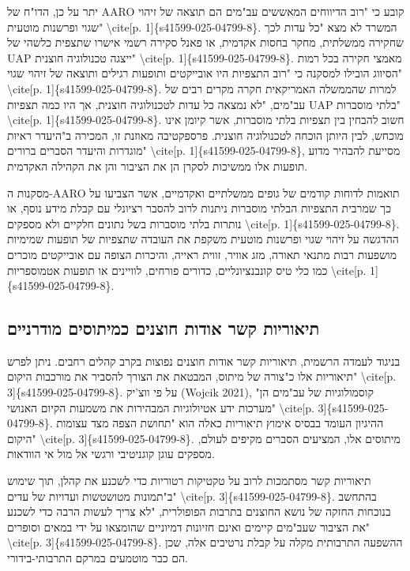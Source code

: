 \documentclass[12pt,a4paper]{article}
\begin{document}
יתר על כן, הדו"ח של AARO קובע כי "רוב הדיווחים המאששים עב"מים הם תוצאה של זיהוי שגוי ופרשנות מוטעית" \textbackslash{}cite[p. 1]\{s41599-025-04799-8\}. המשרד לא מצא "כל עדות לכך שחקירה ממשלתית, מחקר בחסות אקדמית, או פאנל סקירה רשמי אישרו שתצפית כלשהי של UAP ייצגה טכנולוגיה חוצנית" \textbackslash{}cite[p. 1]\{s41599-025-04799-8\}. מאמצי חקירה בכל רמות הסיווג הובילו למסקנה כי "רוב התצפיות היו אובייקטים ותופעות רגילים ותוצאה של זיהוי שגוי" \textbackslash{}cite[p. 1]\{s41599-025-04799-8\}. למרות שהממשלה האמריקאית חקרה מקרים רבים של עב"מים, "לא נמצאה כל עדות לטכנולוגיה חוצנית, אך היו כמה תצפיות UAP בלתי מוסברות" \textbackslash{}cite[p. 1]\{s41599-025-04799-8\}. חשוב להבחין בין תצפיות בלתי מוסברות, אשר קיומן אינו מוכחש, לבין היותן הוכחה לטכנולוגיה חוצנית. פרספקטיבה מאוזנת זו, המכירה ב"היעדר ראיות מוגדרות והיעדר הסברים ברורים" \textbackslash{}cite[p. 1]\{s41599-025-04799-8\}, מסייעת להבהיר מדוע תופעות אלו ממשיכות לסקרן הן את הציבור והן את הקהילה האקדמית.

מסקנות ה-AARO תואמות לדוחות קודמים של גופים ממשלתיים ואקדמיים, אשר הצביעו על כך שמרבית התצפיות הבלתי מוסברות ניתנות לרוב להסבר רציונלי עם קבלת מידע נוסף, או נותרות בלתי מוסברות בשל נתונים חלקיים ולא מספקים \textbackslash{}cite[p. 1]\{s41599-025-04799-8\}. ההדגשה על זיהוי שגוי ופרשנות מוטעית משקפת את העובדה שתצפיות של תופעות שמימיות מושפעות רבות מתנאי תאורה, מזג אוויר, זווית ראייה, והיכרות הצופה עם אובייקטים מוכרים כמו כלי טיס קונבנציונליים, כדורים פורחים, לוויינים או תופעות אטמוספריות \textbackslash{}cite[p. 1]\{s41599-025-04799-8\}.

\subsection{תיאוריות קשר אודות חוצנים כמיתוסים מודרניים}
בניגוד לעמדה הרשמית, תיאוריות קשר אודות חוצנים נפוצות בקרב קהלים רחבים. ניתן לפרש תיאוריות אלו כ"צורה של מיתוס, המבטאת את הצורך להסביר את מורכבות היקום" \textbackslash{}cite[p. 3]\{s41599-025-04799-8\}. על פי ווצ'יק (Wojcik 2021), "קוסמולוגיות של עב"מים הן מערכות ידע אטיולוגיות המבהירות את משמעות הקיום האנושי" \textbackslash{}cite[p. 3]\{s41599-025-04799-8\}. ההיגיון העומד בבסיס אימוץ תיאוריות כאלה הוא "תחושת הצפה מצד עצומות היקום" \textbackslash{}cite[p. 3]\{s41599-025-04799-8\}. מיתוסים אלו, המציעים הסברים מקיפים לעולם, מספקים עוגן קוגניטיבי ורגשי אל מול אי הוודאות.

תיאוריות קשר מסתמכות לרוב על טקטיקות רטוריות כדי לשכנע את קהלן, תוך שימוש ב"תמונות מטושטשות ועדויות של עדים" \textbackslash{}cite[p. 3]\{s41599-025-04799-8\}. בהתחשב בנוכחות החזקה של נושא החוצנים בתרבות הפופולרית, "לא צריך לעשות הרבה כדי לשכנע את הציבור שעב"מים קיימים ואינם חזיונות דמיוניים שהומצאו על ידי במאים וסופרים" \textbackslash{}cite[p. 3]\{s41599-025-04799-8\}. ההשפעה התרבותית מקלה על קבלת נרטיבים אלה, שכן הם כבר מוטמעים במרקם התרבותי-בידורי.
\end{document}
